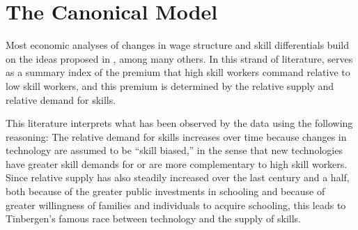 \documentclass[12pt]{article}
\newcommand{\highlightB}[1]{{\emph{\color{MyBlue}{#1}}}}
\theoremstyle{definition}
\begin{document}



\section{The Canonical Model}
Most economic analyses of changes in wage structure and skill differentials build on the ideas proposed in \citet{katzChangesRelativeWages1992, cardCanFallingSupply2001}, among many others. In this strand of literature, \highlightB{the college/high school log wage ratio} serves as a summary index of the premium that high skill workers command relative to low skill workers, and this premium is determined by the relative supply and relative demand for skills. 

This literature interprets what has been observed by the data using the following reasoning: The relative demand for skills increases over time because changes in technology are assumed to be ``skill biased,'' in the sense that new technologies have greater skill demands for or are more complementary to high skill workers. Since relative supply has also steadily increased over the last century and a half, both because of the greater public investments in schooling and because of greater willingness of families and individuals to acquire schooling, this leads to Tinbergen's famous race between technology and the supply of skills. 
\end{document}
